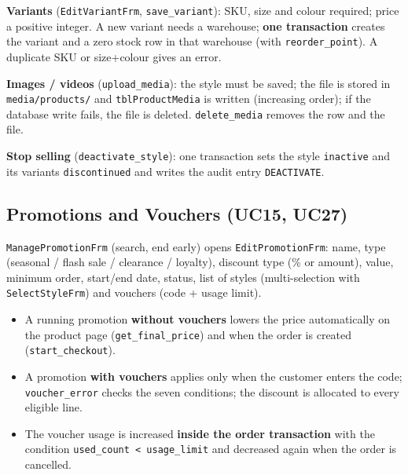 \textbf{Variants} (\texttt{EditVariantFrm}, \texttt{save\_\allowbreak{}variant}):
SKU, size and colour required; price a positive integer. A new variant
needs a warehouse; \textbf{one transaction} creates the variant and a
zero stock row in that warehouse (with \texttt{reorder\_\allowbreak{}point}). A
duplicate SKU or size+colour gives an error.

\textbf{Images / videos} (\texttt{upload\_\allowbreak{}media}): the style must be
saved; the file is stored in \texttt{media/\allowbreak{}products/\allowbreak{}} and
\texttt{tblProductMedia} is written (increasing order); if the database
write fails, the file is deleted. \texttt{delete\_\allowbreak{}media} removes the row
and the file.

\textbf{Stop selling} (\texttt{deactivate\_\allowbreak{}style}): one transaction sets
the style \texttt{inactive} and its variants \texttt{discontinued} and
writes the audit entry \texttt{DEACTIVATE}.

\hypertarget{promotions-and-vouchers-uc15-uc27}{%
\subsection{Promotions and Vouchers (UC15,
UC27)}\label{promotions-and-vouchers-uc15-uc27}}

\texttt{ManagePromotionFrm} (search, end early) opens
\texttt{EditPromotionFrm}: name, type (seasonal / flash sale / clearance
/ loyalty), discount type (\% or amount), value, minimum order,
start/end date, status, list of styles (multi-selection with
\texttt{SelectStyleFrm}) and vouchers (code + usage limit).

\begin{itemize}
\tightlist
\item
  A running promotion \textbf{without vouchers} lowers the price
  automatically on the product page (\texttt{get\_\allowbreak{}final\_\allowbreak{}price}) and
  when the order is created (\texttt{start\_\allowbreak{}checkout}).
\item
  A promotion \textbf{with vouchers} applies only when the customer
  enters the code; \texttt{voucher\_\allowbreak{}error} checks the seven conditions;
  the discount is allocated to every eligible line.
\item
  The voucher usage is increased \textbf{inside the order transaction}
  with the condition \texttt{used\_\allowbreak{}count \textless{} usage\_\allowbreak{}limit} and
  decreased again when the order is cancelled.
\end{itemize}

